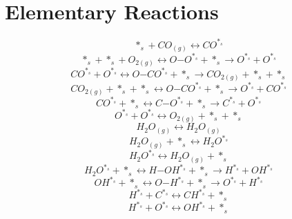 \documentclass[a4paper,8pt]{report}
\begin{document}
\section{Elementary Reactions}
\begin{equation}
\label{reaction_0}
*_s+CO_{(g)} \leftrightarrow CO^{*_s}
\end{equation}
\begin{equation}
\label{reaction_1}
*_s+*_s+O_{2(g)} \leftrightarrow O\mathrm{-}O^{*_s}+*_s \rightarrow O^{*_s}+O^{*_s}
\end{equation}
\begin{equation}
\label{reaction_2}
CO^{*_s}+O^{*_s} \leftrightarrow O\mathrm{-}CO^{*_s}+*_s \rightarrow CO_{2(g)}+*_s+*_s
\end{equation}
\begin{equation}
\label{reaction_3}
CO_{2(g)}+*_s+*_s \leftrightarrow O\mathrm{-}CO^{*_s}+*_s \rightarrow O^{*_s}+CO^{*_s}
\end{equation}
\begin{equation}
\label{reaction_4}
CO^{*_s}+*_s \leftrightarrow C\mathrm{-}O^{*_s}+*_s \rightarrow C^{*_s}+O^{*_s}
\end{equation}
\begin{equation}
\label{reaction_5}
O^{*_s}+O^{*_s} \leftrightarrow O_{2(g)}+*_s+*_s
\end{equation}
\begin{equation}
\label{reaction_6}
H_{2}O_{(g)} \leftrightarrow H_{2}O_{(g)}
\end{equation}
\begin{equation}
\label{reaction_7}
H_{2}O_{(g)}+*_s \leftrightarrow H_{2}O^{*_s}
\end{equation}
\begin{equation}
\label{reaction_8}
H_{2}O^{*_s} \leftrightarrow H_{2}O_{(g)}+*_s
\end{equation}
\begin{equation}
\label{reaction_9}
H_{2}O^{*_s}+*_s \leftrightarrow H\mathrm{-}OH^{*_s}+*_s \rightarrow H^{*_s}+OH^{*_s}
\end{equation}
\begin{equation}
\label{reaction_10}
OH^{*_s}+*_s \leftrightarrow O\mathrm{-}H^{*_s}+*_s \rightarrow O^{*_s}+H^{*_s}
\end{equation}
\begin{equation}
\label{reaction_11}
H^{*_s}+C^{*_s} \leftrightarrow CH^{*_s}+*_s
\end{equation}
\begin{equation}
\label{reaction_12}
H^{*_s}+O^{*_s} \leftrightarrow OH^{*_s}+*_s
\end{equation}
\end{document}
